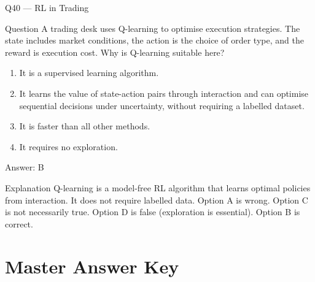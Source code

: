 \documentclass[aspectratio=169,8pt]{beamer}
\begin{document}
	\begin{frame}{Q40 --- RL in Trading}
		\begin{block}{Question}
			A trading desk uses Q-learning to optimise execution strategies. The state includes market conditions, the action is the choice of order type, and the reward is execution cost. Why is Q-learning suitable here?
			\begin{enumerate}
				\item It is a supervised learning algorithm.
				\item It learns the value of state-action pairs through interaction and can optimise sequential decisions under uncertainty, without requiring a labelled dataset.
				\item It is faster than all other methods.
				\item It requires no exploration.
			\end{enumerate}
		\end{block}
		\begin{exampleblock}{Answer: B}\end{exampleblock}
		\begin{block}{Explanation}
			Q-learning is a model-free RL algorithm that learns optimal policies from interaction. It does not require labelled data. Option A is wrong. Option C is not necessarily true. Option D is false (exploration is essential). Option B is correct.
		\end{block}
	\end{frame}
	
	\section{Master Answer Key}
	
\end{document}

